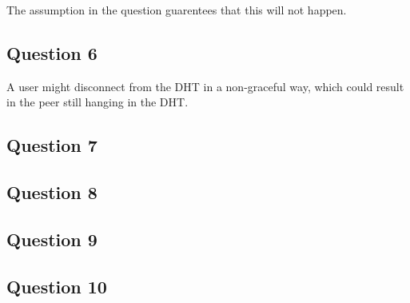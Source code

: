 The assumption in the question guarentees that this will not happen.

\subsection{Question 6}
A user might disconnect from the DHT in a non-graceful way, which
could result in the peer still hanging in the DHT.

\subsection{Question 7}

\subsection{Question 8}

\subsection{Question 9}

\subsection{Question 10}